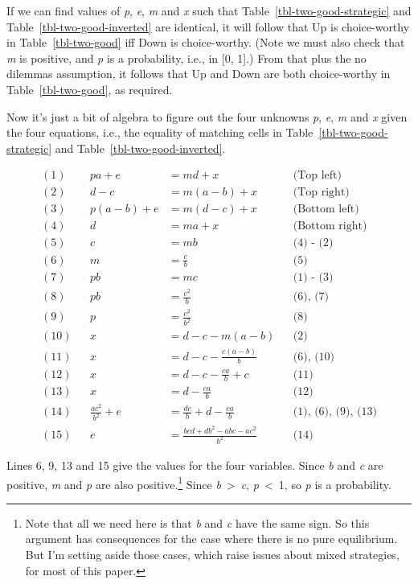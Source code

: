 \documentclass[
  11pt,
  letterpaper,
  DIV=11,
  numbers=noendperiod,
  twoside]{scrartcl}
\begin{document}
If we can find values of \emph{p}, \emph{e}, \emph{m} and \emph{x} such
that Table~\ref{tbl-two-good-strategic} and
Table~\ref{tbl-two-good-inverted} are identical, it will follow that Up
is choice-worthy in Table~\ref{tbl-two-good} iff Down is choice-worthy.
(Note we must also check that \emph{m} is positive, and \emph{p} is a
probability, i.e., in {[}0, 1{]}.) From that plus the no dilemmas
assumption, it follows that Up and Down are both choice-worthy in
Table~\ref{tbl-two-good}, as required.

Now it's just a bit of algebra to figure out the four unknowns \emph{p},
\emph{e}, \emph{m} and \emph{x} given the four equations, i.e., the
equality of matching cells in Table~\ref{tbl-two-good-strategic} and
Table~\ref{tbl-two-good-inverted}.

\begin{align*}
(1) && pa + e &= md + x && \text{(Top left)} \\
(2) && d - c &= m(a - b) + x && \text{(Top right)} \\
(3) && p(a - b) + e &= m(d - c) + x && \text{(Bottom left)} \\
(4) && d &= ma + x && \text{(Bottom right)} \\
(5) && c &= mb && \text{(4) - (2)} \\
(6) && m &= \frac{c}{b} && \text{(5)} \\
(7) && pb &= mc && \text{(1) - (3)} \\
(8) && pb &= \frac{c^2}{b} && \text{(6), (7)} \\
(9) && p &= \frac{c^2}{b^2} && \text{(8)} \\
(10) && x &= d - c - m(a - b) && \text{(2)} \\
(11) && x &= d - c - \frac{c(a - b)}{b} && \text{(6), (10)} \\
(12) && x &= d - c - \frac{ca}{b} + c && \text{(11)} \\
(13) && x &= d - \frac{ca}{b} && \text{(12)} \\
(14) && \frac{ac^2}{b^2} + e &= \frac{dc}{b} + d - \frac{ca}{b} && \text{(1), (6), (9), (13)} \\
(15) && e &= \frac{bcd + db^2 - abc - ac^2}{b^2} && \text{(14)}
\end{align*}

Lines 6, 9, 13 and 15 give the values for the four variables. Since
\emph{b} and \emph{c} are positive, \emph{m} and \emph{p} are also
positive.\footnote{Note that all we need here is that \emph{b} and
  \emph{c} have the same sign. So this argument has consequences for the
  case where there is no pure equilibrium. But I'm setting aside those
  cases, which raise issues about mixed strategies, for most of this
  paper.} Since \emph{b}~\textgreater~\emph{c}, \emph{p}~\textless~1, so
\emph{p} is a probability.
\end{document}

